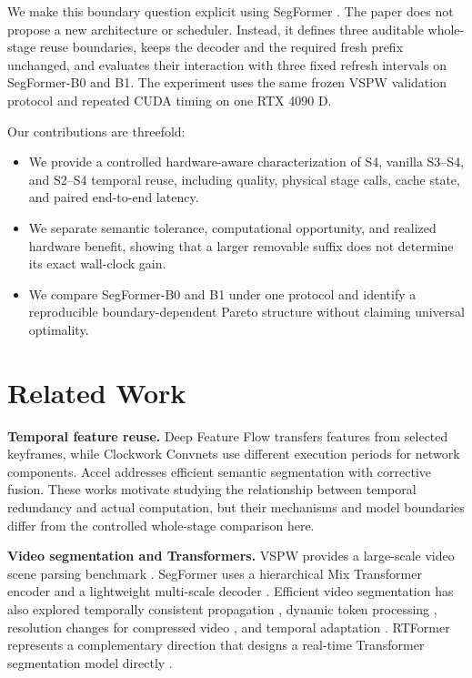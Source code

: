 \documentclass{article}
\begin{document}
We make this boundary question explicit using SegFormer \cite{xie2021segformer}. The paper does not propose a new architecture or scheduler. Instead, it defines three auditable whole-stage reuse boundaries, keeps the decoder and the required fresh prefix unchanged, and evaluates their interaction with three fixed refresh intervals on SegFormer-B0 and B1. The experiment uses the same frozen VSPW validation protocol and repeated CUDA timing on one RTX 4090 D.

Our contributions are threefold:
\begin{itemize}
\item We provide a controlled hardware-aware characterization of S4, vanilla S3--S4, and S2--S4 temporal reuse, including quality, physical stage calls, cache state, and paired end-to-end latency.
\item We separate semantic tolerance, computational opportunity, and realized hardware benefit, showing that a larger removable suffix does not determine its exact wall-clock gain.
\item We compare SegFormer-B0 and B1 under one protocol and identify a reproducible boundary-dependent Pareto structure without claiming universal optimality.
\end{itemize}

\section{Related Work}
\textbf{Temporal feature reuse.} Deep Feature Flow \cite{zhu2017dff} transfers features from selected keyframes, while Clockwork Convnets \cite{shelhamer2016clockwork} use different execution periods for network components. Accel \cite{jain2019accel} addresses efficient semantic segmentation with corrective fusion. These works motivate studying the relationship between temporal redundancy and actual computation, but their mechanisms and model boundaries differ from the controlled whole-stage comparison here.

\textbf{Video segmentation and Transformers.} VSPW provides a large-scale video scene parsing benchmark \cite{miao2021vspw}. SegFormer uses a hierarchical Mix Transformer encoder and a lightweight multi-scale decoder \cite{xie2021segformer}. Efficient video segmentation has also explored temporally consistent propagation \cite{baghbaderani2024bofp}, dynamic token processing \cite{liu2024dovit}, resolution changes for compressed video \cite{hu2023arseg}, and temporal adaptation \cite{zhang2022auxadapt}. RTFormer represents a complementary direction that designs a real-time Transformer segmentation model directly \cite{wang2022rtformer}.
\end{document}
